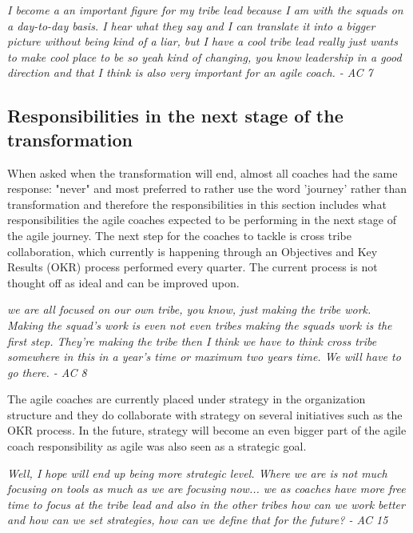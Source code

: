 \documentclass[11pt,a4paper]{report}
\begin{document}
\begin{displayquote}
\textit{
I become a an important figure for my tribe lead because I am with the squads on a day-to-day basis. I hear what they say and I can translate it into a bigger picture without being kind of a liar, but I have a cool tribe lead really just wants to make cool place to be so yeah kind of changing, you know leadership in a good direction and that I think is also very important for an agile coach. - AC 7
}
\end{displayquote}

\subsection{Responsibilities in the next stage of the transformation}
When asked when the transformation will end, almost all coaches had the same response: "never" and most preferred to rather use the word 'journey' rather than transformation and therefore the responsibilities in this section includes what responsibilities the agile coaches expected to be performing in the next stage of the agile journey. 
The next step for the coaches to tackle is cross tribe collaboration, which currently is happening through an Objectives and Key Results (OKR) process \cite{wodtke2016introduction} performed every quarter. The current process is not thought off as ideal and can be improved upon.

\begin{displayquote}
\textit{
we are all focused on our own tribe, you know, just making the tribe work. Making the squad's work is even not even tribes making the squads work is the first step. They're making the tribe then I think we have to think cross tribe somewhere in this in a year's time or maximum two years time. We will have to go there. - AC 8
}
\end{displayquote}

\noindent The agile coaches are currently placed under strategy in the organization structure and they do collaborate with strategy on several initiatives such as the OKR process. In the future, strategy will become an even bigger part of the agile coach responsibility as agile was also seen as a strategic goal. 

\begin{displayquote}
\textit{
Well, I hope will end up being more strategic level. Where we are is not much focusing on tools as much as we are focusing now... we as coaches have more free time to focus at the tribe lead and also in the other tribes how can we work better and how can we set strategies, how can we define that for the future? - AC 15
}
\end{displayquote}
\end{document}
